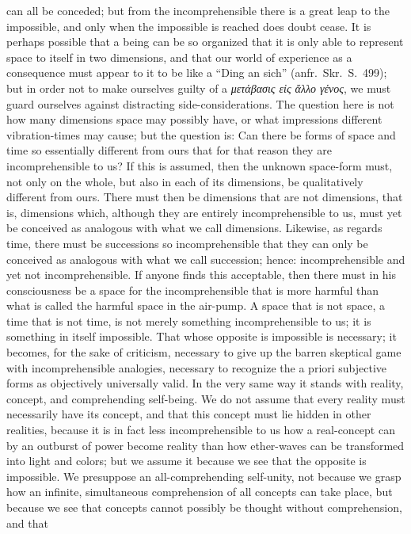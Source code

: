 \documentclass[12pt]{article}
\begin{document}
{can all be conceded; but from the incomprehensible there is a great leap to
the impossible, and only when the impossible is reached does doubt cease. It
is perhaps possible that a being can be so organized that it is only able to
represent space to itself in two dimensions, and that our world of experience
as a consequence must appear to it to be like a ``Ding an sich'' (anfr.\ Skr.\
S.\ 499); but in order not to make ourselves guilty of a \textit{μετάβασις εἰς
ἄλλο γένος}, we must
guard ourselves against distracting side-considerations. The question here is
not how many dimensions space may possibly have, or what impressions different
vibration-times may cause; but the question is: Can there be forms of space
and time so essentially different from ours that for that reason they are
incomprehensible to us? If this is assumed, then the unknown space-form must,
not only on the whole, but also in each of its dimensions, be qualitatively
different from ours. There must then be dimensions that are not dimensions,
that is, dimensions which, although they are entirely incomprehensible to us,
must yet be conceived as analogous with what we call dimensions. Likewise, as
regards time, there must be successions so incomprehensible that they can only
be conceived as analogous with what we call succession; hence: incomprehensible
and yet not incomprehensible. If anyone finds this acceptable, then there must
in his consciousness be a space for the incomprehensible that is more harmful
than what is called the harmful space in the air-pump. A space that is not
space, a time that is not time, is not merely something incomprehensible to
us; it is something in itself impossible. That whose opposite is impossible is
necessary; it becomes, for the sake of criticism, necessary to give up the
barren skeptical game with incomprehensible analogies, necessary to recognize
the a priori subjective forms as objectively universally valid. In the very
same way it stands with reality, concept, and comprehending self-being. We do
not assume that every reality must necessarily have its concept, and that this
concept must lie hidden in other realities, because it is in fact less
incomprehensible to us how a real-concept can by an outburst of power become
reality than how ether-waves can be transformed into light and colors; but we
assume it because we see that the opposite is impossible. We presuppose an
all-comprehending self-unity, not because we grasp how an infinite,
simultaneous comprehension of all concepts can take place, but because we see
that concepts cannot possibly be thought without comprehension, and that
}
\end{document}

